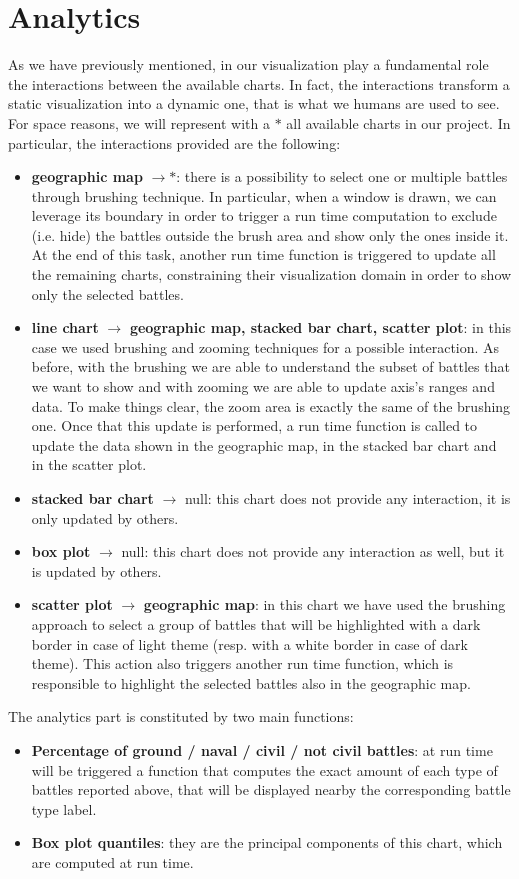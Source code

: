 \section{Analytics}
As we have previously mentioned, in our visualization play a fundamental role the interactions between the available charts. In fact, the interactions transform a static visualization into a dynamic one, that is what we humans are used to see. For space reasons, we will represent with a $*$ all available charts in our project. In particular, the interactions provided are the following:
\begin{itemize}
    \item \textbf{geographic map} $\rightarrow *$: there is a possibility to select one or multiple battles through brushing technique. In particular, when a window is drawn, we can leverage its boundary in order to trigger a run time computation to exclude (i.e. hide) the battles outside the brush area and show only the ones inside it. At the end of this task, another run time function is triggered to update all the remaining charts, constraining their visualization domain in order to show only the selected battles.
    \item \textbf{line chart} $\rightarrow$ \textbf{geographic map, stacked bar chart, scatter plot}: in this case we used brushing and zooming techniques for a possible interaction. As before, with the brushing we are able to understand the subset of battles that we want to show and with zooming we are able to update axis's ranges and data. To make things clear, the zoom area is exactly the same of the brushing one. Once that this update is performed, a run time function is called to update the data shown in the geographic map, in the stacked bar chart and in the scatter plot.
    \item \textbf{stacked bar chart} $\rightarrow$ null: this chart does not provide any interaction, it is only updated by others.
    \item \textbf{box plot} $\rightarrow$ null: this chart does not provide any interaction as well, but it is updated by others.
    \item \textbf{scatter plot} $\rightarrow$ \textbf{geographic map}: in this chart we have used the brushing approach to select a group of battles that will be highlighted with a dark border in case of light theme (resp. with a white border in case of dark theme). This action also triggers another run time function, which is responsible to highlight the selected battles also in the geographic map. 
\end{itemize}

The analytics part is constituted by two main functions:
\begin{itemize}
\item \textbf{Percentage of ground / naval / civil / not civil battles}: at run time will be triggered a function that computes the exact amount of each type of battles reported above, that will be displayed nearby the corresponding battle type label.
\item \textbf{Box plot quantiles}: they are the principal components of this chart, which are computed at run time.
\end{itemize}
